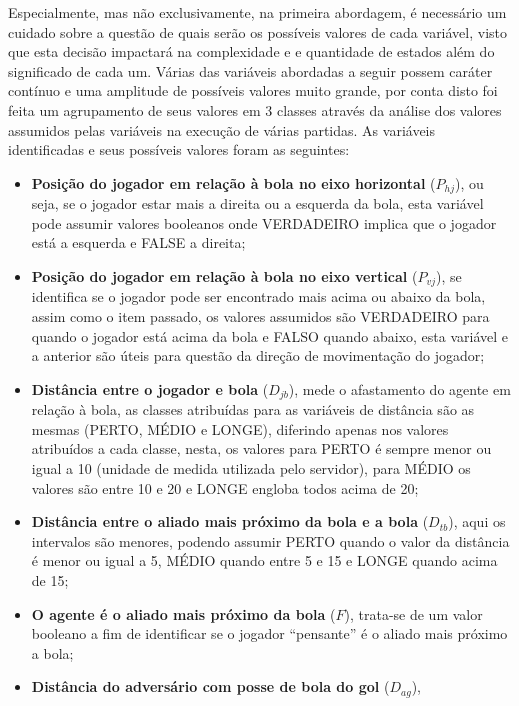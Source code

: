 Especialmente, mas não exclusivamente, na primeira abordagem, é necessário um
cuidado sobre a questão de quais serão os possíveis valores de cada variável,
visto que esta decisão impactará na complexidade e e quantidade de estados além
do significado de cada um. Várias das variáveis abordadas a seguir possem
caráter contínuo e uma amplitude de possíveis valores muito grande, por conta
disto foi feita um agrupamento de seus valores em 3 classes através da análise
dos valores assumidos pelas variáveis na execução de várias partidas. As
variáveis identificadas e seus possíveis valores foram as seguintes:

\begin{itemize}
    \item \textbf{Posição do jogador em relação à bola no eixo horizontal}
    ($P_{hj}$), ou seja, se o jogador estar mais a direita ou a esquerda da
    bola, esta variável pode assumir valores booleanos onde VERDADEIRO implica
    que o jogador está a esquerda e FALSE a direita;
    \item \textbf{Posição do jogador em relação à bola no eixo vertical}
    ($P_{vj}$), se identifica se o jogador pode ser encontrado mais acima ou
    abaixo da bola, assim como o item passado, os valores assumidos são
    VERDADEIRO para quando o jogador está acima da bola e FALSO quando abaixo,
    esta variável e a anterior são úteis para questão da direção de movimentação
    do jogador;
    \item \textbf{Distância entre o jogador e bola} ($D_{jb}$), mede o
    afastamento do agente em relação à bola, as classes atribuídas para as
    variáveis de distância são as mesmas (PERTO, MÉDIO e LONGE), diferindo
    apenas nos valores atribuídos a cada classe, nesta, os valores para PERTO é
    sempre menor ou igual a 10 (unidade de medida utilizada pelo servidor), para
    MÉDIO os valores são entre 10 e 20 e LONGE engloba todos acima de 20;
    \item \textbf{Distância entre o aliado mais próximo da bola e a bola}
    ($D_{tb}$), aqui os intervalos são menores, podendo assumir PERTO quando o
    valor da distância é menor ou igual a 5, MÉDIO quando entre 5 e 15 e LONGE
    quando acima de 15;
    \item \textbf{O agente é o aliado mais próximo da bola} ($F$), trata-se de
    um valor booleano a fim de identificar se o jogador ``pensante'' é o aliado
    mais próximo a bola;
    \item \textbf{Distância do adversário com posse de bola do gol} ($D_{ag}$),

\end{itemize}
